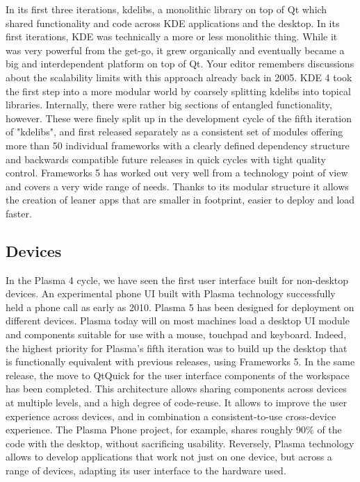 In its first three iterations, kdelibs, a monolithic library on top of Qt which shared functionality and code across KDE applications and the desktop. In its first iterations, KDE was technically a more or less monolithic thing. While it was very powerful from the get-go, it grew organically and eventually became a big and interdependent platform on top of Qt. Your editor remembers discussions about the scalability limits with this approach already back in 2005. KDE 4 took the first step into a more modular world by coarsely splitting kdelibs into topical libraries. Internally, there were rather big sections of entangled functionality, however. These were finely split up in the development cycle of the fifth iteration of "kdelibs", and first released separately as a consistent set of modules offering more than 50 individual frameworks with a clearly defined dependency structure and backwards compatible future releases in quick cycles with tight quality control. Frameworks 5 has worked out very well from a technology point of view and covers a very wide range of needs. Thanks to its modular structure it allows the creation of leaner apps that are smaller in footprint, easier to deploy and load faster.

\subsection*{Devices}

In the Plasma 4 cycle, we have seen the first user interface built for non-desktop devices. An experimental phone UI built with Plasma technology successfully held a phone call as early as 2010. Plasma 5 has been designed for deployment on different devices. Plasma today will on most machines load a desktop UI module and components suitable for use with a mouse, touchpad and keyboard.
Indeed, the highest priority for Plasma's fifth iteration was to build up the desktop that is functionally equivalent with previous releases, using Frameworks 5. In the same release, the move to QtQuick for the user interface components of the workspace has been completed.
This architecture allows sharing components across devices at multiple levels, and a high degree of code-reuse. It allows to improve the user experience across devices, and in combination a consistent-to-use cross-device experience. The Plasma Phone project, for example, shares roughly 90\% of the code with the desktop, without sacrificing usability.
Reversely, Plasma technology allows to develop applications that work not just on one device, but across a range of devices, adapting its user interface to the hardware used.


